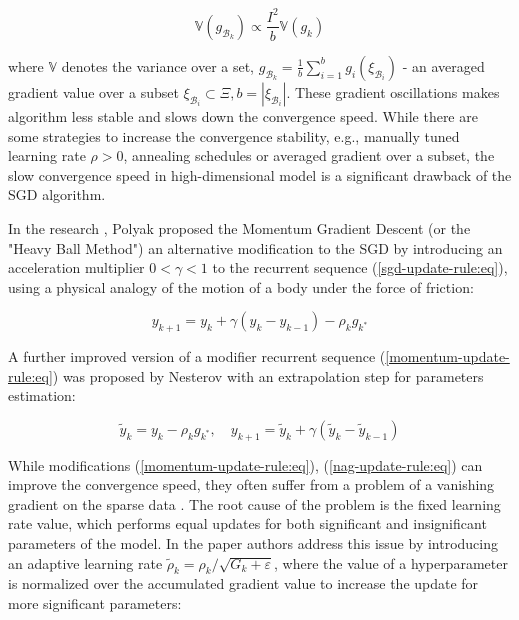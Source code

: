 \begin{equation}
    \label{sgd-oscillations:eq}
        \mathbb{V} (g_{\mathcal{B}_k}) \propto \frac{I^2}{b} \mathbb{V} (g_k)
\end{equation}

\noindent where $ \mathbb{V} $ denotes the variance over a set, $ g_{\mathcal{B}_k} = \frac{1}{b} \sum_{i=1}^{b} g_i (\xi_{\mathcal{B}_i}) $ - an averaged gradient value over a subset $ \xi_{\mathcal{B}_i} \subset \Xi, b = | \xi_{\mathcal{B}_i} | $. These gradient oscillations makes algorithm less stable and slows down the convergence speed. While there are some strategies to increase the convergence stability, e.g., manually tuned learning rate $ \rho > 0 $, annealing schedules \cite{Robbins_Monro_1951} or averaged gradient over a subset, the slow convergence speed in high-dimensional model \cite{Norkin_Kozyriev_Norkin_2024} is a significant drawback of the SGD algorithm.

In the research \cite{Poliak_1987}, Polyak proposed the Momentum Gradient Descent (or the "Heavy Ball Method") an alternative modification to the SGD by introducing an acceleration multiplier $ 0 < \gamma < 1 $ to the recurrent sequence (\ref{sgd-update-rule:eq}), using a physical analogy of the motion of a body under the force of friction:

\begin{equation}
    \label{momentum-update-rule:eq}
        y_{k+1} = y_k + \gamma (y_k - y_{k-1}) - \rho_k g_{k^*}
\end{equation}

A further improved version of a modifier recurrent sequence (\ref{momentum-update-rule:eq}) was proposed by Nesterov \cite{nesterov1983method,walkington_2023} with an extrapolation
step for parameters estimation:

\begin{equation}
    \label{nag-update-rule:eq}
        \tilde{y}_k = y_k - \rho_k g_{k^*}, \quad y_{k+1} = \tilde{y}_k + \gamma (\tilde{y}_k - \tilde{y}_{k-1})
\end{equation}

While modifications (\ref{momentum-update-rule:eq}), (\ref{nag-update-rule:eq}) can improve the convergence speed, they often suffer from a problem of a vanishing gradient on the sparse data \cite{Bottou_Curtis_Nocedal_2018}. The root cause of the problem is the fixed learning rate value, which performs equal updates for both significant and insignificant parameters of the model. In the paper \cite{Duchi_2011} authors address this issue by introducing an adaptive learning rate $ \tilde{\rho}_k = \rho_k / \sqrt{G_k + \varepsilon} $, where the value of a hyperparameter is normalized over the accumulated gradient value to increase the update for more significant parameters:

